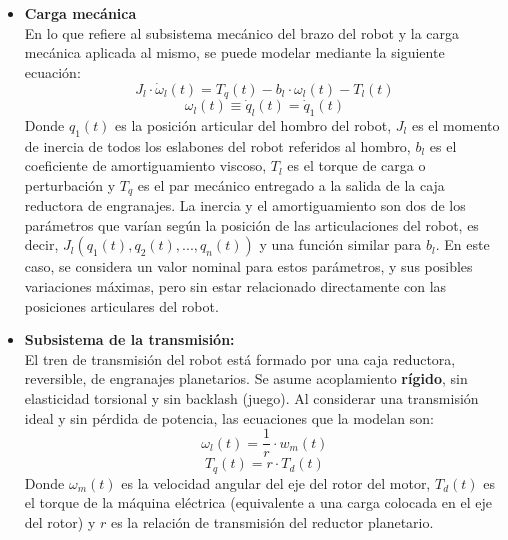 \documentclass[10pt]{article}
\begin{document}
\begin{itemize}
	\item \textbf{Carga mecánica}\vspace{0.3cm}\\
	En lo que refiere al subsistema mecánico del brazo del robot y la carga mecánica aplicada al mismo, se puede modelar mediante la siguiente ecuación:
	\begin{equation}
		\label{eqn:cargaMecanica}
		J_{l}\cdot \dot{\omega }_{l}\left ( t \right )=T_{q}\left ( t \right )-b_{l}\cdot \omega_{l}\left ( t \right )-T_{l}\left ( t \right )
	\end{equation}
	\begin{equation}
		\omega_{l}\left ( t \right )\equiv \dot{q}_{l}\left ( t \right )= \dot{q}_1\left ( t \right )
	\end{equation}
	Donde $q_{1}(t)$ es la posición articular del hombro del robot, $J_{l}$ es el momento de inercia de todos los eslabones del robot referidos al hombro, $b_{l}$ es el coeficiente de amortiguamiento viscoso, $T_{l}$ es el torque de carga o perturbación y $T_{q}$ es el par mecánico entregado a la salida de la caja reductora de engranajes.
	La inercia y el amortiguamiento son dos de los parámetros que varían según la posición de las articulaciones del robot, es decir, $J_{l}(q_{1}(t),q_{2}(t),...,q_{n}(t))$ y una función similar para $b_{l}$.
	En este caso, se considera un valor nominal para estos parámetros, y sus posibles variaciones máximas, pero sin estar relacionado directamente con las posiciones articulares del robot.
	
	\item \textbf{Subsistema de la transmisión:}\vspace{0.3cm}\\
	El tren de transmisión del robot está formado por una caja reductora, reversible, de engranajes planetarios. Se asume acoplamiento \textbf{rígido}, sin elasticidad torsional y sin backlash (juego). Al considerar una transmisión ideal y sin pérdida de potencia, las ecuaciones que la modelan son:
	\begin{equation}
		\label{eqn:relacionTransmision}
		\omega_{l}\left ( t \right )=\frac{1}{r}\cdot w_{m}\left ( t \right )
	\end{equation}
	\begin{equation}
		\label{eqn:torqueTransmision}
		T_{q}\left ( t \right )=r\cdot T_{d}\left ( t \right )
	\end{equation}
	Donde $\omega_{m}(t)$ es la velocidad angular del eje del rotor del motor, $T_{d}(t)$ es el torque de la máquina eléctrica (equivalente a una carga colocada en el eje del rotor) y $r$ es la relación de transmisión del reductor planetario.
	

\end{itemize}
\end{document}
